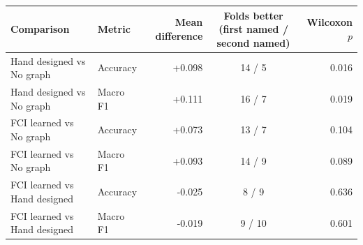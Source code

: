 \begin{tabular}{llrcr}
\toprule
Comparison & Metric & Mean difference & Folds better (first named / second named) & Wilcoxon $p$ \\
\midrule
Hand designed vs No graph & Accuracy & +0.098 & 14 / 5 & 0.016 \\
Hand designed vs No graph & Macro F1 & +0.111 & 16 / 7 & 0.019 \\
FCI learned vs No graph & Accuracy & +0.073 & 13 / 7 & 0.104 \\
FCI learned vs No graph & Macro F1 & +0.093 & 14 / 9 & 0.089 \\
FCI learned vs Hand designed & Accuracy & -0.025 & 8 / 9 & 0.636 \\
FCI learned vs Hand designed & Macro F1 & -0.019 & 9 / 10 & 0.601 \\
\bottomrule
\end{tabular}

